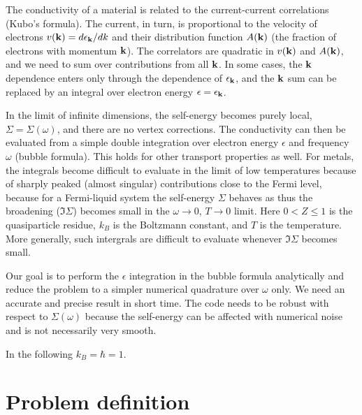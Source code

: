 \documentclass[prb,amsmath,amssymb,onecolumn,nopacs,floatfix,longbibliography]{revtex4-1}
\begin{document}
The conductivity of a material is related to the current-current
correlations (Kubo's formula). The current, in turn, is proportional
to the velocity of electrons $v({\mathbf{k}})=d\epsilon_{\mathbf{k}}/dk$ and their
distribution function $A({\mathbf{k}})$ (the fraction of electrons with
momentum ${\mathbf{k}}$). The correlators are quadratic in $v({\mathbf{k}})$ and
$A({\mathbf{k}})$, and we need to sum over contributions from all ${\mathbf{k}}$.
In some cases, the ${\mathbf{k}}$ dependence enters only through the
dependence of $\epsilon_{\mathbf{k}}$, and the ${\mathbf{k}}$ sum can be replaced
by an integral over electron energy $\epsilon=\epsilon_{\mathbf{k}}$.

In the limit of infinite dimensions, the self-energy becomes purely
local, $\Sigma=\Sigma(\omega)$, and there are no vertex corrections.
The conductivity can then be evaluated from a simple double
integration over electron energy $\epsilon$ and frequency $\omega$
(bubble formula). This holds for other transport properties as well.
For metals, the integrals become difficult to evaluate in the limit of
low temperatures because of sharply peaked (almost singular)
contributions close to the Fermi level, because for a Fermi-liquid
system the self-energy $\Sigma$ behaves as
%
%
thus the broadening ($\Im\Sigma$) becomes small in the $\omega \to 0$,
$T \to 0$ limit. Here $0<Z\leq 1$ is the quasiparticle residue, $k_B$
is the Boltzmann constant, and $T$ is the temperature. More generally,
such intergrals are difficult to evaluate whenever $\Im \Sigma$ becomes
small.

Our goal is to perform the $\epsilon$ integration in the bubble
formula analytically and reduce the problem to a simpler numerical
quadrature over $\omega$ only. We need an accurate and precise result
in short time. The code needs to be robust with respect to
$\Sigma(\omega)$ because the self-energy can be affected with
numerical noise and is not necessarily very smooth.

In the following $k_B=\hbar=1$.


\section{Problem definition}

\newcommand{\de}{\mathrm{d}\epsilon}
\newcommand{\dom}{\mathrm{d}\omega}
\end{document}
